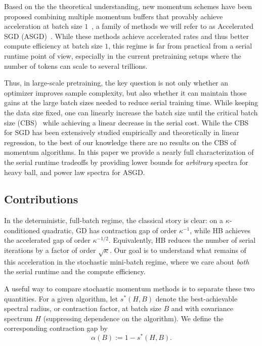 \documentclass{article}
\begin{document}
Based on the the theoretical understanding, new momentum schemes have been proposed combining multiple momentum buffers that provably achieve acceleration at batch size $1$~\citep{jain2018accelerating,vaswani2019fast,liu2018accelerating,gupta2024nesterov, ferbach2025dimension, pagliardini2024ademamix}, a family of methods we will refer to as Accelerated SGD (ASGD)~\citep{kidambi2018insufficiency,jain2018accelerating,ferbach2025dimension,lee2022trajectory}. While these methods achieve accelerated rates and thus better compute efficiency at batch size $1$, this regime is far from practical from a serial runtime point of view, especially in the current pretraining setups where the number of tokens can scale to several trillions. 

Thus, in large-scale pretraining, the key question is not only whether an optimizer improves sample complexity, but also whether it can maintain those gains at the large batch sizes needed to reduce serial training time. While keeping the data size fixed, one can linearly increase the batch size until the critical batch size (CBS)~\citep{zhang2024does,shallue2019measuring,merrill2025critical,meterez2025seesaw} while achieving a linear decrease in the serial cost. While the CBS for SGD has been extensively studied empirically and theoretically in linear regression, to the best of our knowledge there are no results on the CBS of momentum algorithms. In this paper we provide a nearly full characterization of the serial runtime tradeoffs by providing lower bounds for \emph{arbitrary} spectra for heavy ball, and power law spectra for ASGD.

\subsection{Contributions}
In the deterministic, full-batch regime, the classical story is clear:
on a \(\kappa\)-conditioned quadratic, GD has contraction gap of order
\(\kappa^{-1}\), while HB achieves the accelerated gap of order
\(\kappa^{-1/2}\). Equivalently, HB reduces the number of serial
iterations by a factor of order \(\sqrt{\kappa}\). Our goal is to
understand what remains of this acceleration in the stochastic
mini-batch regime, where we care about \emph{both} the
serial runtime and the compute efficiency. 

A useful way to compare stochastic momentum methods is to separate these two
quantities. For a given algorithm, let $s^*(H,B)$
denote the best-achievable spectral radius, or contraction factor, at batch size
\(B\) and with covariance spectrum \(H\) (suppressing dependence on
the algorithm). We define the corresponding contraction gap by
\[
\alpha(B):=1-s^*(H,B).
\]
\end{document}

